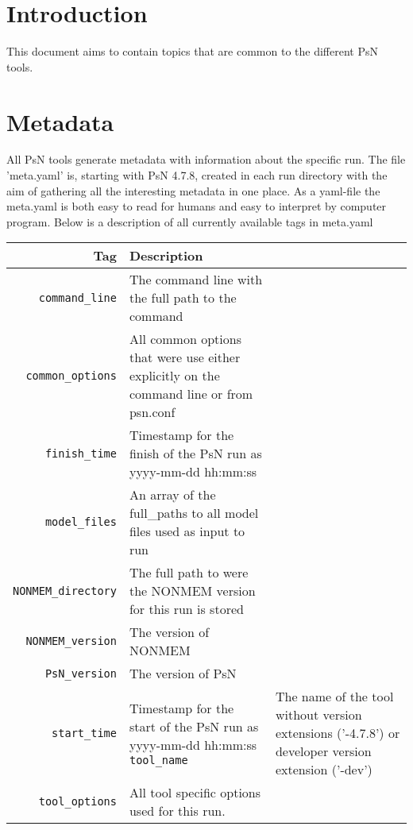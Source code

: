 

\usepackage{tabularx}





\maketitle
\newcommand{\guidetoolname}{<toolname>}

\section{Introduction}
This document aims to contain topics that are common to the different PsN tools.

\section{Metadata}
All PsN tools generate metadata with information about the specific run. The file 'meta.yaml' is, starting with PsN 4.7.8, created in each run directory with the aim of gathering all the interesting metadata in one place. As a yaml-file the meta.yaml is both easy to read for humans and easy to interpret by computer program. Below is a description of all currently available tags in meta.yaml

\begin{center}
    \begin{tabularx}{\linewidth}{ r X }
    \hline
    Tag & Description \\ \hline
    \verb|command_line| & The command line with the full path to the command \\ \hline
    \verb|common_options| & All common options that were use either explicitly on the command line or from psn.conf \\ \hline
    \verb|finish_time| & Timestamp for the finish of the PsN run as yyyy-mm-dd hh:mm:ss \\ \hline
    \verb|model_files| & An array of the full\_paths to all model files used as input to run \\ \hline
    \verb|NONMEM_directory| & The full path to were the NONMEM version for this run is stored \\ \hline
    \verb|NONMEM_version| & The version of NONMEM \\ \hline
    \verb|PsN_version| & The version of PsN \\ \hline
    \verb|start_time| & Timestamp for the start of the PsN run as yyyy-mm-dd hh:mm:ss
    \verb|tool_name| & The name of the tool without version extensions \mbox{('-4.7.8')} or developer version extension ('-dev') \\ \hline
    \verb|tool_options| & All tool specific options used for this run.
  \end{tabularx}
\end{center}


